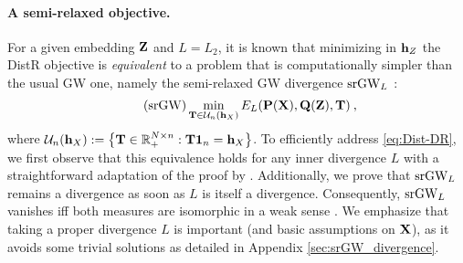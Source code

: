 \paragraph{A semi-relaxed objective.} For a given embedding ${\mathbf{Z}}$ and $L=L_2$, it is known that minimizing in ${\mathbf{h}}_{Z}$ the DistR objective is \emph{equivalent} to a problem that is computationally simpler than the usual GW one, namely the semi-relaxed GW divergence $\operatorname{srGW}_L$ \citep{vincent2021semi}:
\begin{equation*}\tag{srGW} \label{eq:srGW}
	\min_{{\mathbf{T}} \in {\mathcal{U}}_n({\mathbf{h}}_X)} E_L({\mathbf{P}}({\mathbf{X}}), {\mathbf{Q}}({\mathbf{Z}}), {\mathbf{T}}) \:,
\end{equation*}
where ${\mathcal{U}}_n({\mathbf{h}}_X) := \left\{ {\mathbf{T}} \in \mathbb{R}_{+}^{N \times n}: {\mathbf{T}} \bm{1}_n = {\mathbf{h}}_X\right\}$. To efficiently address \cref{eq:Dist-DR}, we first observe that this equivalence holds for any inner divergence $L$ with a straightforward adaptation of the proof by \citep{vincent2021semi}.
Additionally, we prove that $\operatorname{srGW}_L$ remains a divergence as soon as $L$ is itself a divergence. Consequently, $\operatorname{srGW}_L$ vanishes iff both measures are isomorphic in a weak sense \citep{chowdhury2019gromov}. We emphasize that taking a proper divergence $L$ is important (and basic assumptions on ${\mathbf{X}}$), as it avoids some trivial solutions as detailed in Appendix \ref{sec:srGW_divergence}.





